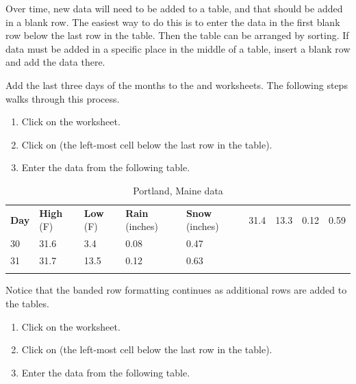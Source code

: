 Over time, new data will need to be added to a table, and that should be added in a blank row. The easiest way to do this is to enter the data in the first blank row below the last row in the table. Then the table can be arranged by sorting. If data must be added in a specific place in the middle of a table, insert a blank row and add the data there.

Add the last three days of the months to the  and  worksheets. The following steps walks through this process.

\begin{enumerate}
	\item Click on the  worksheet.
	\item Click on  (the left-most cell below the last row in the table).
	\item Enter the data from the following table.
\end{enumerate}

\begin{table}[H]
	{\small
		\begin{longtable}{L{0.50in}L{0.50in}L{0.50in}L{0.50in}L{0.50in}} %
			\textbf{Day} & \textbf{High} (\textdegree F) & \textbf{Low} (\textdegree F) & \textbf{Rain} (inches) & \textbf{Snow} (inches) \endhead
			 & 31.4 & 13.3 & 0.12 & 0.59 \\ 
			30 & 31.6 & 3.4  & 0.08 & 0.47 \\ 
			31 & 31.7 & 13.5 & 0.12 & 0.63 \\ 
			\caption{Portland, Maine data}
			\label{05:tab02}
		\end{longtable}
	} %
\end{table}

Notice that the banded row formatting continues as additional rows are added to the tables.

\begin{enumerate}
	\item Click on the  worksheet.
	\item Click on  (the left-most cell below the last row in the table).
	\item Enter the data from the following table.
\end{enumerate}

